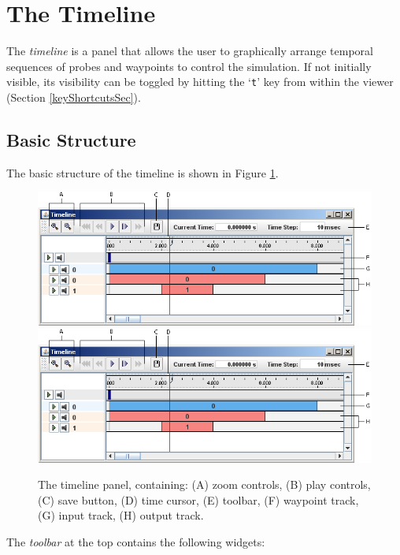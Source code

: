 \documentclass{article}
\begin{document}
\section{The Timeline}
\label{TimelineSec}

The {\it timeline} is a panel that allows the user to graphically
arrange temporal sequences of probes and waypoints to control the
simulation. If not initially visible, its visibility can be toggled by
hitting the `{\tt t}' key from within the viewer (Section
\ref{keyShortcutsSec}).

\subsection{Basic Structure}

The basic structure of the timeline is shown in 
Figure \ref{timelineFig}.

\begin{figure}
\begin{center}
\iflatexml
\includegraphics[]{images/timeline}
\else
\includegraphics[width=.75\textwidth]{images/timeline}
\fi
\end{center}
\caption{The timeline panel, containing: (A) zoom controls, (B) play
controls, (C) save button, (D) time cursor, (E) toolbar, (F) waypoint
track, (G) input track, (H) output track.}%
\label{timelineFig}
\end{figure}

The {\it toolbar} at the top contains the following widgets:
\end{document}
